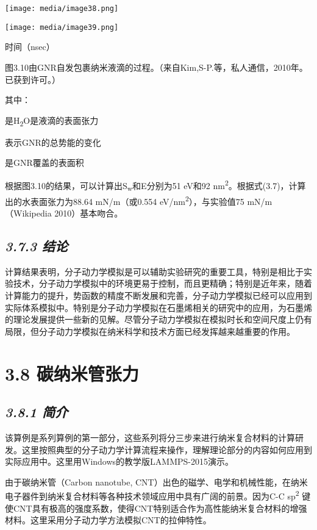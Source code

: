 \documentclass[
]{article}
\begin{document}
\texttt{[image: media/image38.png]}

\texttt{[image: media/image39.png]}

时间（nsec）

图3.10由GNR自发包裹纳米液滴的过程。（来自Kim,S-P.等，私人通信，2010年。已获到许可。）

其中：

是H\textsubscript{2}O是液滴的表面张力

表示GNR的总势能的变化

是GNR覆盖的表面积

根据图3.10的结果，可以计算出S\textsubscript{w}和E分别为51 eV和92
nm\textsuperscript{2}。根据式(3.7)，计算出的水表面张力为88.64
mN/m（或0.554 eV/nm\textsuperscript{2}），与实验值75 mN/m（Wikipedia
2010）基本吻合。

\hypertarget{ux7ed3ux8bba-1}{%
\subsection{\texorpdfstring{\emph{3.7.3
结论}}{3.7.3 结论}}\label{ux7ed3ux8bba-1}}

计算结果表明，分子动力学模拟是可以辅助实验研究的重要工具，特别是相比于实验技术，分子动力学模拟中的环境更易于控制，而且更精确；特别是近年来，随着计算能力的提升，势函数的精度不断发展和完善，分子动力学模拟已经可以应用到实际体系模拟中。特别是分子动力学模拟在石墨烯相关的研究中的应用，为石墨烯的理论发展提供一些新的见解。尽管分子动力学模拟在模拟时长和空间尺度上仍有局限，但分子动力学模拟在纳米科学和技术方面已经发挥越来越重要的作用。

\hypertarget{ux78b3ux7eb3ux7c73ux7ba1ux5f20ux529b}{%
\section{3.8 碳纳米管张力}\label{ux78b3ux7eb3ux7c73ux7ba1ux5f20ux529b}}

\hypertarget{ux7b80ux4ecb}{%
\subsection{\texorpdfstring{\emph{3.8.1
简介}}{3.8.1 简介}}\label{ux7b80ux4ecb}}

该算例是系列算例的第一部分，这些系列将分三步来进行纳米复合材料的计算研发。这里按照典型的分子动力学计算流程来操作，理解理论部分的内容如何应用到实际应用中。这里用Windows的教学版LAMMPS-2015演示。

由于碳纳米管（Carbon nanotube,
CNT）出色的磁学、电学和机械性能，在纳米电子器件到纳米复合材料等各种技术领域应用中具有广阔的前景。因为C-C
sp\textsuperscript{2}
键使CNT具有极高的强度系数，使得CNT特别适合作为高性能纳米复合材料的增强材料。这里采用分子动力学方法模拟CNT的拉伸特性。
\end{document}
